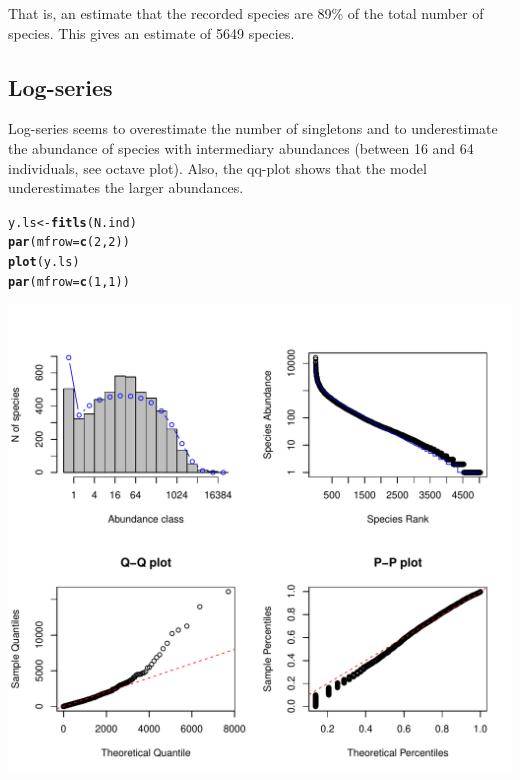 \documentclass[12pt, A4]{article}\usepackage[]{graphicx}\usepackage[]{color}
\makeatletter
\def\maxwidth{ %
  \ifdim\Gin@nat@width>\linewidth
    \linewidth
  \else
    \Gin@nat@width
  \fi
}
\newcommand{\hlnum}[1]{\textcolor[rgb]{0.686,0.059,0.569}{#1}}%
\newcommand{\hlstd}[1]{\textcolor[rgb]{0.345,0.345,0.345}{#1}}%
\newcommand{\hlkwb}[1]{\textcolor[rgb]{0.69,0.353,0.396}{#1}}%
\newcommand{\hlkwc}[1]{\textcolor[rgb]{0.333,0.667,0.333}{#1}}%
\newcommand{\hlkwd}[1]{\textcolor[rgb]{0.737,0.353,0.396}{\textbf{#1}}}%
\newenvironment{kframe}{%
 \def\at@end@of@kframe{}%
 \ifinner\ifhmode%
  \def\at@end@of@kframe{\end{minipage}}%
  \begin{minipage}{\columnwidth}%
 \fi\fi%
 \def\FrameCommand##1{\hskip\@totalleftmargin \hskip-\fboxsep
 \colorbox{shadecolor}{##1}\hskip-\fboxsep
     \hskip-\linewidth \hskip-\@totalleftmargin \hskip\columnwidth}%
 \MakeFramed {\advance\hsize-\width
   \@totalleftmargin\z@ \linewidth\hsize
   \@setminipage}}%
 {\par\unskip\endMakeFramed%
 \at@end@of@kframe}
\newenvironment{knitrout}{}{} %
\makeatother
\begin{document}
That is, an estimate that the recorded species are 89\%
of the total number of species.
This gives an estimate of 5649 species.


\subsection*{Log-series}

Log-series seems to overestimate the number of singletons
and to underestimate the abundance of species with intermediary abundances
(between 16 and 64 individuals, see octave plot). Also, the qq-plot shows that
the model underestimates the larger abundances.

 
\begin{knitrout}
\color{fgcolor}\begin{kframe}
\begin{alltt}
\hlstd{y.ls} \hlkwb{<-} \hlkwd{fitls}\hlstd{(N.ind)}
\hlkwd{par}\hlstd{(}\hlkwc{mfrow}\hlstd{=}\hlkwd{c}\hlstd{(}\hlnum{2}\hlstd{,}\hlnum{2}\hlstd{))}
\hlkwd{plot}\hlstd{(y.ls)}
\hlkwd{par}\hlstd{(}\hlkwc{mfrow}\hlstd{=}\hlkwd{c}\hlstd{(}\hlnum{1}\hlstd{,}\hlnum{1}\hlstd{))}
\end{alltt}
\end{kframe}

{\centering \includegraphics[width=\maxwidth]{figure/fit_ls-1} 

}



\end{knitrout}
\end{document}
